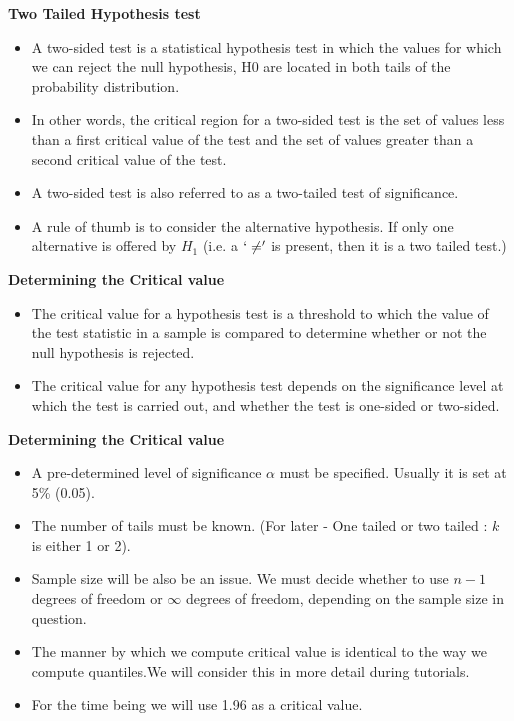 \noindent \textbf{Two Tailed Hypothesis test}
\begin{itemize}
\item
A two-sided test is a statistical hypothesis test in which the values for which we can reject the null hypothesis, H0 are located in both tails of the probability distribution.

\item In other words, the critical region for a two-sided test is the set of values less than a first critical value of the test and the set of values greater than a second critical value of the test.

\item A two-sided test is also referred to as a two-tailed test of significance.
\item A rule of thumb is to consider the alternative hypothesis.  If only one alternative is offered by $H_1$ (i.e. a $`\neq'$ is present, then it is a two tailed test.)
\end{itemize}






\noindent \textbf{Determining the Critical value}
\begin{itemize} \item The critical value for a hypothesis test is a threshold to which the value of the test statistic in a sample is compared to determine whether or not the null hypothesis is rejected.

\item The critical value for any hypothesis test depends on the significance level at which the test is carried out, and whether the test is one-sided or two-sided.
\end{itemize}






\noindent \textbf{Determining the Critical value}
\begin{itemize}
\item A pre-determined level of significance $\alpha$ must be specified. Usually it is set at 5\% (0.05).
\item The number of tails must be known. (For later - One tailed or two tailed : $k$ is either 1 or 2).
\item Sample size will be also be an issue. We must decide whether to use $n-1$ degrees of freedom or $\infty$ degrees of freedom, depending on the sample size in question.
\item The manner by which we compute critical value is identical to the way we compute quantiles.We will consider this in more detail during tutorials.
\item For the time being we will use 1.96 as a critical value.
\end{itemize}


